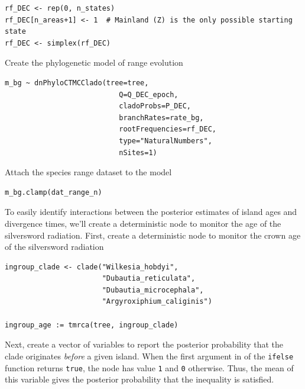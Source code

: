 \begin{snugshade}
\begin{lstlisting}
rf_DEC <- rep(0, n_states)
rf_DEC[n_areas+1] <- 1  # Mainland (Z) is the only possible starting state
rf_DEC <- simplex(rf_DEC)
\end{lstlisting}
\end{snugshade}


Create the phylogenetic model of range evolution

\begin{snugshade}
\begin{lstlisting}
m_bg ~ dnPhyloCTMCClado(tree=tree,
                           Q=Q_DEC_epoch,
                           cladoProbs=P_DEC,
                           branchRates=rate_bg,
                           rootFrequencies=rf_DEC,
                           type="NaturalNumbers",
                           nSites=1)        
\end{lstlisting}
\end{snugshade}


Attach the species range dataset to the model

\begin{snugshade}
\begin{lstlisting}
m_bg.clamp(dat_range_n)
\end{lstlisting}
\end{snugshade}


To easily identify interactions between the posterior estimates of island ages and divergence times, we'll create a deterministic node to monitor the age of the silversword radiation.
First, create a deterministic node to monitor the crown age of the silversword radiation

\begin{snugshade}
\begin{lstlisting}
ingroup_clade <- clade("Wilkesia_hobdyi",
                       "Dubautia_reticulata",
                       "Dubautia_microcephala",
                       "Argyroxiphium_caliginis")

ingroup_age := tmrca(tree, ingroup_clade)
\end{lstlisting}
\end{snugshade}

Next, create a vector of variables to report the posterior probability that the clade originates {\it before} a given island.
When the first argument in of the {\tt ifelse} function returns {\tt true}, the node has value {\tt 1} and {\tt 0} otherwise.
Thus, the mean of this variable gives the posterior probability that the inequality is satisfied.

